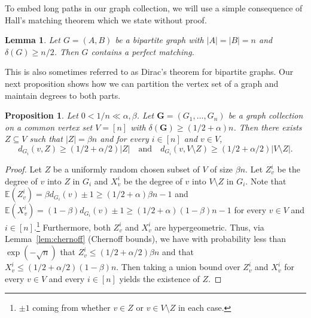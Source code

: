 \documentclass[11pt, dvipsnames]{amsart}
\theoremstyle{plain}
\newtheorem{prop}[theo]{Proposition}
\newtheorem{lemma}[theo]{Lemma}
\theoremstyle{definition}
\newcommand{\mbf}[1]{\mathbf{#1}}
\newcommand{\ks}[1]{\textcolor{red}{ $\blacktriangleright$\ {\sf KS: #1}\ 
  $\blacktriangleleft$ }}
\begin{document}
To embed long paths in our graph collection, we will use a simple consequence of Hall's matching theorem which we state without proof.%
\begin{lemma}\label{lem:hall}
    Let $G=(A,B)$ be a bipartite graph with $|A|=|B|=n$ and $\delta(G)\geq n/2$. Then $G$ contains a perfect matching.
\end{lemma}

This is also sometimes referred to as Dirac's theorem for bipartite graphs. Our next proposition shows how we can partition the vertex set of a graph and maintain  degrees to both parts. 
\begin{prop}\label{prop:Z}
Let $0 < 1/n \ll \alpha, \beta$. 
Let $\mathbf{G}=(G_1, \ldots, G_n)$ be a graph collection on a common vertex set $V=[n]$ with $\delta(\mbf G) \geq (1/2+\alpha)n$. Then there exists $Z \subseteq V$ such that $|Z|= \beta n$ and for every $i \in [n]$ and $v \in V$, 
\begin{equation*}  d_{G_i}(v,Z) \geq (1/2+\alpha/2)|Z|
\quad\text{and}\quad
 d_{G_i}(v, V\setminus Z) \geq (1/2+\alpha/2)|V\setminus Z|.\end{equation*} %
\end{prop}
\begin{proof}
Let $Z$ be a uniformly random chosen subset of $V$ of size $\beta n$. Let $Z^i_v$ be the degree of $v$ into $Z$ in $G_i$ and $X^i_v$ be the degree of $v$ into $V \setminus Z$ in $G_i$. Note that $\mathbb{E}(Z^i_v)=\beta d_{G_i}(v) \pm 1 \geq (1/2+\alpha)\beta n-1$ and $\mathbb{E}(X^i_v)=(1-\beta) d_{G_i}(v) \pm 1 \geq (1/2+\alpha)(1-\beta) n -1$ for every $v \in V$ and $i \in [n]$.\footnote{$\pm 1$ coming from whether $v \in Z$ or $v \in V\setminus Z$ in each case.} Furthermore, both $Z_v^i$ and $X_v^i$ are hypergeometric. 
Thus, via Lemma~\ref{lem:chernoff} (Chernoff bounds), we have with probability less than $\exp(-\sqrt{n})$ that $Z^i_v \leq (1/2+\alpha/2)\beta n$ and that $X^i_v \leq (1/2+\alpha/2)(1-\beta) n$. Then taking a union bound over $Z^i_v$ and $X^i_v$ for every $v \in V$ and every $i \in [n]$ yields the existence of $Z$.
\end{proof}
\end{document}
